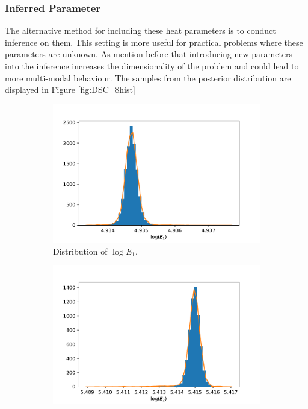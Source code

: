 \subsubsection{Inferred Parameter}
The alternative method for including these heat parameters is to conduct inference on them. This setting is more useful for practical problems where these parameters are unknown. As mention before that introducing new parameters into the inference increases the dimensionality of the problem and could lead to more multi-modal behaviour. The samples from the posterior distribution are displayed in Figure \ref{fig:DSC_8hist}

\begin{figure}[h!]
\centering
\begin{subfigure}{.5\textwidth}
  \centering
  \includegraphics[width=\linewidth]{figures/bayesian/SIM_Q/hist_E1.pdf}  \caption{Distribution of $\log E_1$.}
  \label{fig:subhistE1}
\end{subfigure}%
\begin{subfigure}{.5\textwidth}
  \centering
  \includegraphics[width=\linewidth]{figures/bayesian/SIM_Q/hist_E2.pdf}

\end{subfigure}
\end{figure}
